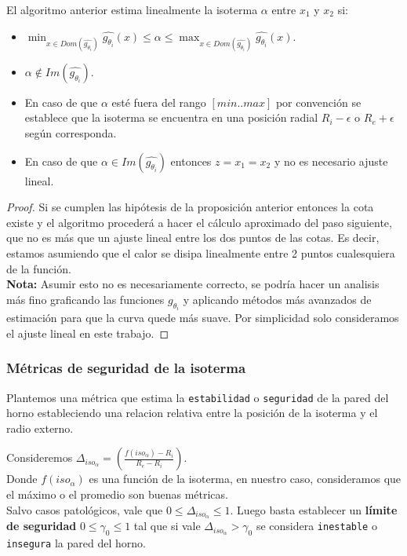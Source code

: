 \begin{proposition}
    El algoritmo anterior estima linealmente la isoterma $\alpha$ entre $x_1$ y $x_2$ si:
    \begin{itemize}
        \item $\displaystyle\min_{x \in Dom(\hat{g_{\theta_i}})}{\hat{g_{\theta_i}}(x)} \leq \alpha \leq \displaystyle\max_{x \in Dom(\hat{g_{\theta_i}})}{\hat{g_{\theta_i}}(x)}$.
        \item $\alpha \notin Im(\hat{g_{\theta_i}})$.
    \end{itemize}
    \begin{itemize}
        \item En caso de que $\alpha$ esté fuera del rango $[min..max]$ por convención se establece que la isoterma se encuentra en una posición radial $R_i - \epsilon$ o $R_e + \epsilon$ según corresponda.
        \item En caso de que $\alpha \in Im(\hat{g_{\theta_i}})$ entonces $z = x_1 = x_2$ y no es necesario ajuste lineal.
    \end{itemize}
\end{proposition}
\begin{proof}
    Si se cumplen las hipótesis de la proposición anterior entonces la cota existe y el algoritmo procederá a hacer el cálculo aproximado del paso siguiente, que no es más que un ajuste lineal entre los dos puntos de las cotas. Es decir, estamos asumiendo que el calor se disipa linealmente entre 2 puntos cualesquiera de la función.\\
    \vspace{0.3cm}
    \textbf{Nota:} Asumir esto no es necesariamente correcto, se podría hacer un analisis más fino graficando las funciones $g_{\theta_i}$ y aplicando métodos más avanzados de estimación para que la curva quede más suave. Por simplicidad solo consideramos el ajuste lineal en este trabajo.
\end{proof}

\subsubsection{Métricas de seguridad de la isoterma}
Plantemos una métrica que estima la \texttt{estabilidad} o \texttt{seguridad} de la pared del horno estableciendo una relacion relativa entre la posición de la isoterma y el radio externo. 
\begin{proposition}
    Consideremos $\Delta_{iso_\alpha} = \left( \frac{f(iso_\alpha) - R_i}{R_e - R_i} \right)$.\\
    Donde $f(iso_\alpha)$ es una función de la isoterma, en nuestro caso, consideramos que el máximo o el promedio son buenas métricas.\\
    Salvo casos patológicos, vale que $0 \leq \Delta_{iso_\alpha}\leq 1$. Luego basta establecer un \textbf{límite de seguridad} $0 \leq \gamma_0 \leq 1$ tal que si vale $\Delta_{iso_\alpha} > \gamma_0$ se considera \texttt{inestable} o \texttt{insegura} la pared del horno.
\end{proposition}

